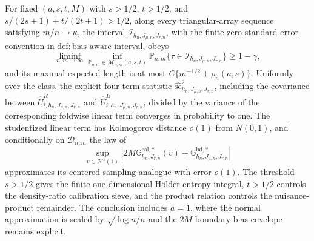 For fixed \((a,s,t,M)\) with \(s>1/2\), \(t>1/2\), and \(s/(2s+1)+t/(2t+1)>1/2\), along every triangular-array sequence satisfying \(m/n\to\kappa\), the interval \(\mathcal I_{h_n,J_{\mu,n},J_{r,n}}\), with the finite zero-standard-error convention in \(\mathrm{def:bias\text{-}aware\text{-}interval}\), obeys
\[
\liminf_{n,m\to\infty}\inf_{\mathbb P_{n,m}\in\mathcal M_{n,m}(a,s,t)}\mathbb P_{n,m}\{\tau\in\mathcal I_{h_n,J_{\mu,n},J_{r,n}}\}\ge1-\gamma,
\]
and its maximal expected length is at most \(C\{m^{-1/2}+\rho_n(a,s)\}\). Uniformly over the class, the explicit four-term statistic \(\widehat{\mathrm{se}}_{h_n,J_{\mu,n},J_{r,n}}^2\), including the covariance between \(\widehat U^R_{i,h_n,J_{\mu,n},J_{r,n}}\) and \(\widehat U^B_{i,h_n,J_{\mu,n},J_{r,n}}\), divided by the variance of the corresponding foldwise linear term converges in probability to one. The studentized linear term has Kolmogorov distance \(o(1)\) from \(N(0,1)\), and conditionally on \(\mathcal D_{n,m}\) the law of
\[
\sup_{v\in\mathcal H^s(1)}|2M\mathbb G^{\mathrm{cal},*}_{h_n,J_{r,n}}(v)+\mathbb G^{\mathrm{bd},*}_{h_n,J_{\mu,n},J_{r,n}}|
\]
approximates its centered sampling analogue with error \(o(1)\). The threshold \(s>1/2\) gives the finite one-dimensional Hölder entropy integral, \(t>1/2\) controls the density-ratio calibration sieve, and the product relation controls the nuisance-product remainder. The conclusion includes \(a=1\), where the normal approximation is scaled by \(\sqrt{\log n/n}\) and the \(2M\) boundary-bias envelope remains explicit.